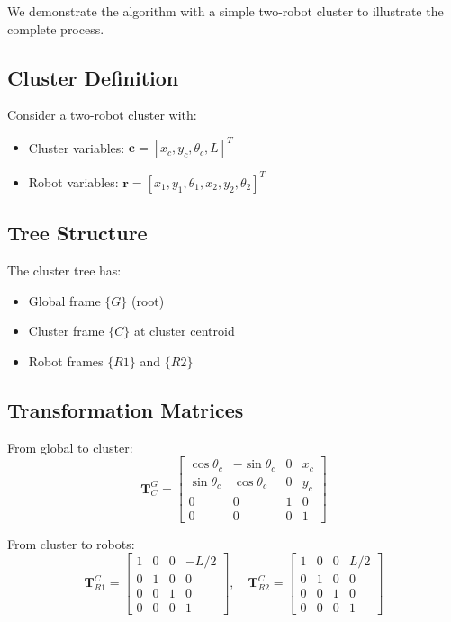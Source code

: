 \documentclass[lettersize,journal]{IEEEtran}
\begin{document}
We demonstrate the algorithm with a simple two-robot cluster to illustrate the complete process.

\subsection{Cluster Definition}

Consider a two-robot cluster with:
\begin{itemize}
\item Cluster variables: $\mathbf{c} = [x_c, y_c, \theta_c, L]^T$
\item Robot variables: $\mathbf{r} = [x_1, y_1, \theta_1, x_2, y_2, \theta_2]^T$
\end{itemize}

\subsection{Tree Structure}

The cluster tree has:
\begin{itemize}
\item Global frame $\{G\}$ (root)
\item Cluster frame $\{C\}$ at cluster centroid
\item Robot frames $\{R1\}$ and $\{R2\}$
\end{itemize}

\subsection{Transformation Matrices}

From global to cluster:
$$\mathbf{T}_C^G = \begin{bmatrix}
\cos\theta_c & -\sin\theta_c & 0 & x_c \\
\sin\theta_c & \cos\theta_c & 0 & y_c \\
0 & 0 & 1 & 0 \\
0 & 0 & 0 & 1
\end{bmatrix}$$

From cluster to robots:
$$\mathbf{T}_{R1}^C = \begin{bmatrix}
1 & 0 & 0 & -L/2 \\
0 & 1 & 0 & 0 \\
0 & 0 & 1 & 0 \\
0 & 0 & 0 & 1
\end{bmatrix}, \quad
\mathbf{T}_{R2}^C = \begin{bmatrix}
1 & 0 & 0 & L/2 \\
0 & 1 & 0 & 0 \\
0 & 0 & 1 & 0 \\
0 & 0 & 0 & 1
\end{bmatrix}$$
\end{document}
